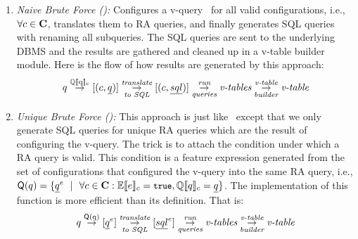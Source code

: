 \begin{enumerate}
\item
\emph{Naive Brute Force (\nbf):}
Configures a v-query \vQ\ for all valid configurations, i.e., 
\ensuremath{\forall \config \in \confSet}, translates them to RA queries,
and finally generates SQL queries with renaming all subqueries. The 
SQL queries are sent to the underlying DBMS and the results are gathered and
cleaned up in a v-table builder module. Here is the flow of how results are generated by 
this approach:
%
\[\vQ \mathrel{\mathop{\rightarrow}^{\mathrm{\eeSem \vQ}}} [ ( \config, \pQ ) ] 
\mathrel{\mathop{\rightarrow}^{\mathrm{\textit{translate}}}_{\mathrm{\textit{to SQL}}}} [ ( \config, \sqlQ ) ]
\mathrel{\mathop{\rightarrow}^{\mathrm{\textit{run}}}_{\mathrm{\textit{queries}}}} \textit{v-tables}
\mathrel{\mathop{\rightarrow}^{\mathrm{\textit{v-table}}}_{\mathrm{\textit{builder}}}} \textit{v-table}
\]

\item
\emph{Unique Brute Force (\ubf):}
This approach is just like \nbf\ except that we only generate SQL 
queries for unique RA queries which are the result of configuring the v-query.
The trick is to attach the condition under which a 
RA query is valid. This condition is a feature expression generated from
the set of configurations that configured the v-query into the same RA query, i.e.,
\ensuremath{
\qGroup \vQ = \setDef {\annot \pQ \myOR \forall \config \in \confSet: \fSem \dimMeta = \t,
\eeSem \vQ = \pQ}
}. The implementation of this function is more efficient than its definition.
That is:
%
\[\vQ \mathrel{\mathop{\rightarrow}^{\mathrm{\qGroup \vQ}}} [ \annot [\dimMeta] {\pQ} ] 
\mathrel{\mathop{\rightarrow}^{\mathrm{\textit{translate}}}_{\mathrm{\textit{to SQL}}}} [ \annot [\dimMeta] {\sqlQ} ]
\mathrel{\mathop{\rightarrow}^{\mathrm{\textit{run}}}_{\mathrm{\textit{queries}}}} \textit{v-tables}
\mathrel{\mathop{\rightarrow}^{\mathrm{\textit{v-table}}}_{\mathrm{\textit{builder}}}} \textit{v-table}
\]


\end{enumerate}
